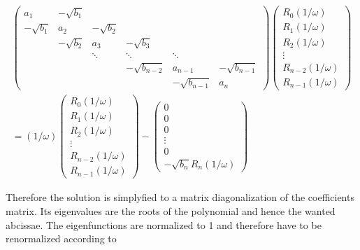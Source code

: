 \begin{equation}
 \begin{split}
 \begin{pmatrix}
a_1        & -\sqrt{b_1}&            &                &             &          \\
-\sqrt{b_1}& a_2        & -\sqrt{b_2}&                &             &          \\
           & -\sqrt{b_2}& a_3        & -\sqrt{b_3}    &             &          \\
           &            & \ddots     & \ddots         & \ddots      &          \\
           &            &            & -\sqrt{b_{n-2}}& a_{n-1}     & -\sqrt{b_{n-1}}\\
           &            &            &                & -\sqrt{b_{n-1}}& a_n   
 \end{pmatrix}
 \begin{pmatrix}
  R_0(1/\omega)\\
  R_1(1/\omega)\\
  R_2(1/\omega)\\
  \vdots\\
  R_{n-2}(1/\omega)\\
  R_{n-1}(1/\omega)
 \end{pmatrix}         \\
 = (1/\omega)
 \begin{pmatrix}
  R_0(1/\omega)\\
  R_1(1/\omega)\\
  R_2(1/\omega)\\
  \vdots\\
  R_{n-2}(1/\omega)\\
  R_{n-1}(1/\omega)
 \end{pmatrix}
 -
 \begin{pmatrix}
  0\\
  0\\
  0\\
  \vdots\\
  0\\
  -\sqrt{b_n} R_{n}(1/\omega)
 \end{pmatrix}
 \end{split}
\end{equation}

Therefore the solution is simplyfied to a matrix diagonalization
of the coefficients matrix. Its eigenvalues are the roots of the polynomial
and hence the wanted abcissae. The eigenfunctions are normalized to 1 and therefore
have to be renormalized according to

